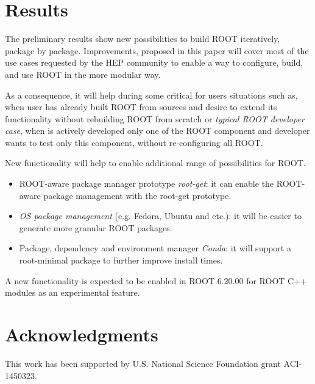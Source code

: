 \documentclass[12pt]{iopart}
\begin{document}
\section{Results}

The preliminary results show new possibilities to build ROOT iteratively, package by package. Improvements, proposed in this paper will cover most of the use cases requested by the HEP community to enable a way to configure, build, and use ROOT in the more modular way.

As a consequence, it will help during some critical for users situations such as, when user has already built ROOT from sources and desire to extend its functionality without rebuilding ROOT from scratch or \textit{typical ROOT developer case}, when is actively developed only one of the ROOT component and developer wants to test only this component, without re-configuring all ROOT.

New functionality will help to enable additional range of possibilities for ROOT.
\begin{itemize}
    \item ROOT-aware package manager prototype \textit{root-get}: it can enable the ROOT-aware package management with the root-get prototype. \cite{pm}
    \item \textit{OS package management} (e.g. Fedora, Ubuntu and etc.): it will be easier to generate more granular ROOT packages.
    \item Package, dependency and environment manager \textit{Conda}: it will support a root-minimal package to further improve install times. 
\end{itemize}

A new functionality is expected to be enabled in ROOT 6.20.00 for ROOT C++ modules \cite{cxxmodules} as an experimental feature.

\section{Acknowledgments}

This work has been supported by U.S. National Science Foundation grant ACI-1450323.
\end{document}
